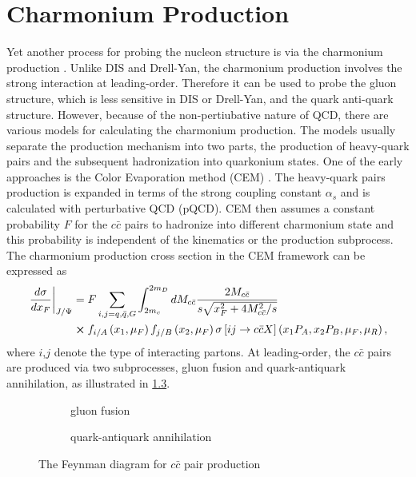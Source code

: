 \documentclass[../main.tex]{subfiles}
\begin{document}
\chapter{Charmonium Production}
\label{ch:jpsi}
Yet another process for probing the nucleon structure is via the charmonium production \cite{peng1995,chang2020}.
Unlike DIS and Drell-Yan, the charmonium production involves the strong interaction
at leading-order. Therefore it can be used to probe the gluon structure, which is
less sensitive in DIS or Drell-Yan, and the quark anti-quark structure. However,
because of the non-pertiubative nature of QCD, there are various models for
calculating the charmonium production. The models usually separate the production
mechanism into two parts, the production of heavy-quark pairs and the subsequent
hadronization into quarkonium states. One of the early approaches is the Color
Evaporation method (CEM) \cite{einhorn1975,bodwin1995,bodwin1997}. The heavy-quark
pairs production is expanded in terms of the strong coupling constant $\alpha_s$
and is calculated with perturbative QCD (pQCD). CEM then assumes a constant
probability $F$ for the $c\bar{c}$ pairs to hadronize into different charmonium
state and this probability is independent of the kinematics or the production
subprocess. The charmonium production cross section in the CEM framework can be
expressed as
\begin{equation}
	\begin{split}
		\left.\frac{d\sigma}{dx_F}\right|_{J/\Psi} &= F \sum_{i,j = q,\bar{q},G}\int^{2m_D}_{2m_c} dM_{c\bar{c}}  \frac{2M_{c\bar{c}}}{s\sqrt{x_F^2+4M_{c\bar{c}}^2/s}}\\
		&\cross f_{i/A}\left(x_1,\mu_F\right)f_{j/B}\left(x_2,\mu_F\right)\sigma\left[ij\rightarrow c\bar{c}X\right]\left(x_1P_A,x_2P_B,\mu_F,\mu_R \right),
	\end{split}
\end{equation}
where $i$,$j$ denote the type of interacting partons. At leading-order, the
$c\bar{c}$ pairs are produced via two subprocesses, gluon fusion and
quark-antiquark annihilation, as illustrated in \cref{fig:charmonium}.
\begin{figure}[htpb!]
	\centering
	\begin{subfigure}{0.4\linewidth}
		\begin{subfigure}{\linewidth}
			
		\end{subfigure}
		\begin{subfigure}{\linewidth}
			
		\end{subfigure}
		\caption{gluon fusion\label{subfig:gluon}}
	\end{subfigure}
	\quad
	\begin{subfigure}{0.4\linewidth}
		
		\caption{quark-antiquark annihilation\label{subfig:qqbar}}
	\end{subfigure}
	\caption{The Feynman diagram for $c\bar{c}$ pair production}
	\label{fig:charmonium}
\end{figure}
\end{document}
